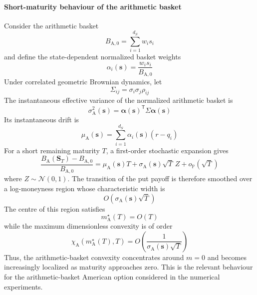 \documentclass{article}
\numberwithin{equation}{subsection}
\theoremstyle{definition}
\theoremstyle{remark}
\begin{document}
\paragraph{Short-maturity behaviour of the arithmetic basket}
Consider the arithmetic basket
\begin{equation}
B_{\mathrm{A},0}
=
\sum_{i=1}^{d_S}w_is_i
\end{equation}
and define the state-dependent normalized basket weights
\begin{equation}
\alpha_i(\boldsymbol{s})
=
\frac{w_is_i}{B_{\mathrm{A},0}}
\end{equation}
Under correlated geometric Brownian dynamics, let
\begin{equation}
\Sigma_{ij}
=
\sigma_i\sigma_j\rho_{ij}
\end{equation}
The instantaneous effective variance of the normalized arithmetic basket is
\begin{equation}
\sigma_{\mathrm{A}}^2(\boldsymbol{s})
=
\boldsymbol{\alpha}(\boldsymbol{s})^{\mathsf T}
\Sigma
\boldsymbol{\alpha}(\boldsymbol{s})
\end{equation}
Its instantaneous drift is
\begin{equation}
\mu_{\mathrm{A}}(\boldsymbol{s})
=
\sum_{i=1}^{d_S}
\alpha_i(\boldsymbol{s})(r-q_i)
\end{equation}
For a short remaining maturity \(T\), a first-order stochastic expansion gives
\begin{equation}
\frac{
B_{\mathrm{A}}(\boldsymbol{S}_T)-B_{\mathrm{A},0}
}{
B_{\mathrm{A},0}
}
=
\mu_{\mathrm{A}}(\boldsymbol{s})T
+
\sigma_{\mathrm{A}}(\boldsymbol{s})\sqrt{T}\,Z
+
o_{\mathbb{P}}(\sqrt{T})
\end{equation}
where \(Z\sim\mathcal{N}(0,1)\). The transition of the put payoff is therefore smoothed over a log-moneyness region whose characteristic width is
\begin{equation}
O
\left(
\sigma_{\mathrm{A}}(\boldsymbol{s})\sqrt{T}
\right)
\end{equation}
The centre of this region satisfies
\begin{equation}
m_{\mathrm{A}}^\star(T)
=
O(T)
\end{equation}
while the maximum dimensionless convexity is of order
\begin{equation}
\chi_{\mathrm{A}}
\left(
m_{\mathrm{A}}^\star(T),T
\right)
=
O
\left(
\frac{1}{
\sigma_{\mathrm{A}}(\boldsymbol{s})\sqrt{T}
}
\right)
\end{equation}
Thus, the arithmetic-basket convexity concentrates around \(m=0\) and becomes increasingly localized as maturity approaches zero. This is the relevant behaviour for the arithmetic-basket American option considered in the numerical experiments.
\end{document}
